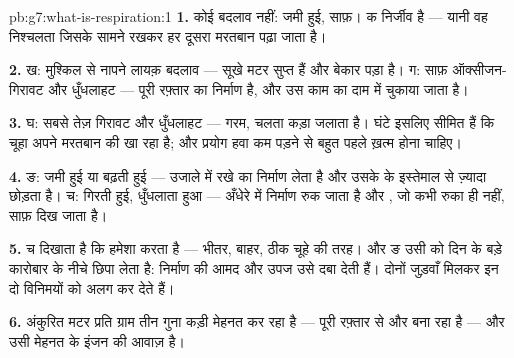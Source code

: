 \begin{solution}{pb:g7:what-is-respiration:1}
\textbf{1.} कोई बदलाव नहीं:  जमी हुई,  साफ़। क
निर्जीव  है --- यानी वह निश्चलता जिसके सामने रखकर हर दूसरा
मरतबान पढ़ा जाता है।

\textbf{2.} ख: मुश्किल से नापने लायक़ बदलाव --- सूखे मटर सुप्त हैं और
 बेकार पड़ा है। ग: साफ़ ऑक्सीजन-गिरावट और धुँधलाहट ---  पूरी
रफ़्तार का निर्माण है, और उस काम का दाम  में चुकाया जाता है।

\textbf{3.} घ: सबसे तेज़ गिरावट और धुँधलाहट --- गरम, चलता  कड़ा
जलाता है। घंटे इसलिए सीमित हैं कि चूहा अपने मरतबान की  खा रहा है;
और प्रयोग हवा कम पड़ने से बहुत पहले ख़त्म होना चाहिए।

\textbf{4.} ङ:  जमी हुई या बढ़ती हुई --- उजाले में रखे  का
निर्माण  लेता है और उसके  के इस्तेमाल से ज़्यादा
 छोड़ता है। च:  गिरती हुई,  धुँधलाता हुआ ---
अँधेरे में निर्माण रुक जाता है और , जो कभी रुका ही नहीं, साफ़ दिख
जाता है।

\textbf{5.} च दिखाता है कि  हमेशा  करता है ---  भीतर,
 बाहर, ठीक चूहे की तरह। और ङ उसी  को दिन के बड़े
कारोबार के नीचे छिपा लेता है: निर्माण की आमद और उपज उसे दबा देती हैं।
दोनों जुड़वाँ मिलकर इन दो विनिमयों को अलग कर देते हैं।

\textbf{6.} अंकुरित मटर प्रति ग्राम तीन गुना कड़ी मेहनत कर रहा है ---
पूरी रफ़्तार से  और  बना रहा है --- और  उसी मेहनत के इंजन
की आवाज़ है।


\end{solution}
